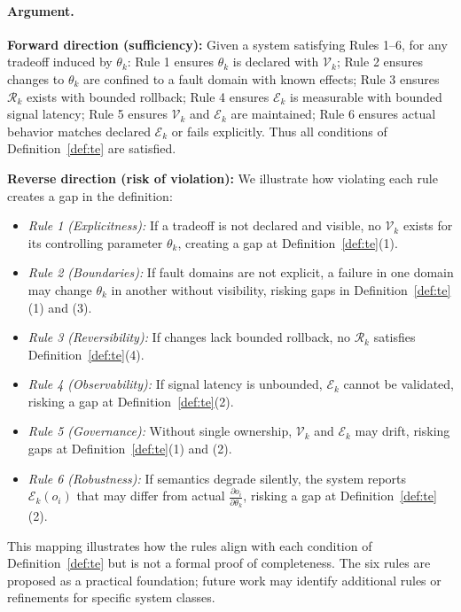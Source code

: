 \documentclass[conference]{IEEEtran}
\begin{document}
\paragraph{Argument.}
\textbf{Forward direction (sufficiency):} Given a system satisfying Rules 1--6, for any tradeoff induced by $\theta_k$: Rule 1 ensures $\theta_k$ is declared with $\mathcal{V}_k$; Rule 2 ensures changes to $\theta_k$ are confined to a fault domain with known effects; Rule 3 ensures $\mathcal{R}_k$ exists with bounded rollback; Rule 4 ensures $\mathcal{E}_k$ is measurable with bounded signal latency; Rule 5 ensures $\mathcal{V}_k$ and $\mathcal{E}_k$ are maintained; Rule 6 ensures actual behavior matches declared $\mathcal{E}_k$ or fails explicitly. Thus all conditions of Definition~\ref{def:te} are satisfied.

\textbf{Reverse direction (risk of violation):} We illustrate how violating each rule creates a gap in the definition:
\begin{itemize}
    \item \textit{Rule 1 (Explicitness):} If a tradeoff is not declared and visible, no $\mathcal{V}_k$ exists for its controlling parameter $\theta_k$, creating a gap at Definition~\ref{def:te}(1).
    \item \textit{Rule 2 (Boundaries):} If fault domains are not explicit, a failure in one domain may change $\theta_k$ in another without visibility, risking gaps in Definition~\ref{def:te}(1) and (3).
    \item \textit{Rule 3 (Reversibility):} If changes lack bounded rollback, no $\mathcal{R}_k$ satisfies Definition~\ref{def:te}(4).
    \item \textit{Rule 4 (Observability):} If signal latency is unbounded, $\mathcal{E}_k$ cannot be validated, risking a gap at Definition~\ref{def:te}(2).
    \item \textit{Rule 5 (Governance):} Without single ownership, $\mathcal{V}_k$ and $\mathcal{E}_k$ may drift, risking gaps at Definition~\ref{def:te}(1) and (2).
    \item \textit{Rule 6 (Robustness):} If semantics degrade silently, the system reports $\mathcal{E}_k(o_i)$ that may differ from actual $\frac{\partial o_i}{\partial \theta_k}$, risking a gap at Definition~\ref{def:te}(2).
\end{itemize}

This mapping illustrates how the rules align with each condition of Definition~\ref{def:te} but is not a formal proof of completeness. The six rules are proposed as a practical foundation; future work may identify additional rules or refinements for specific system classes.
\end{document}

